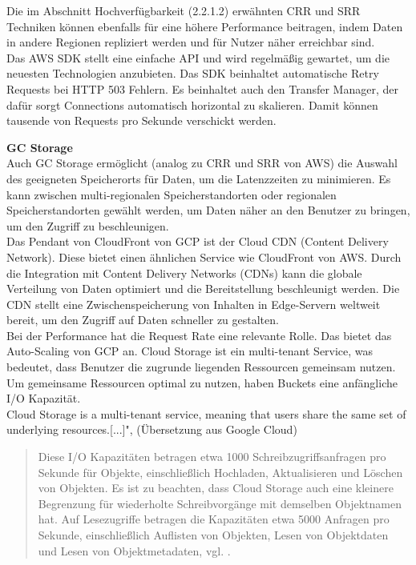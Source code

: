 Die im Abschnitt Hochverfügbarkeit (2.2.1.2) erwähnten CRR und SRR Techniken können ebenfalls für eine höhere Performance beitragen, indem Daten in andere Regionen repliziert werden und für Nutzer näher erreichbar sind.\\

Das AWS SDK stellt eine einfache API und wird regelmäßig gewartet, um die neuesten Technologien anzubieten. Das SDK beinhaltet automatische Retry Requests bei HTTP 503 Fehlern. Es beinhaltet auch den Transfer Manager, der dafür sorgt Connections automatisch horizontal zu skalieren. Damit können tausende von Requests pro Sekunde verschickt werden.

\newpage

\textbf{GC Storage}\\

Auch GC Storage ermöglicht (analog zu CRR und SRR von AWS) die Auswahl des geeigneten Speicherorts für Daten, um die Latenzzeiten zu minimieren. Es kann zwischen multi-regionalen Speicherstandorten oder regionalen Speicherstandorten gewählt werden, um Daten näher an den Benutzer zu bringen, um den Zugriff zu beschleunigen.\\ 

Das Pendant von CloudFront von GCP ist der Cloud CDN (Content Delivery Network). Diese bietet einen ähnlichen Service wie CloudFront von AWS. Durch die Integration mit Content Delivery Networks (CDNs) kann die globale Verteilung von Daten optimiert und die Bereitstellung beschleunigt werden. Die CDN stellt eine Zwischenspeicherung von Inhalten in Edge-Servern weltweit bereit, um den Zugriff auf Daten schneller zu gestalten.\\

Bei der Performance hat die Request Rate eine relevante Rolle. Das bietet das Auto-Scaling von GCP an. Cloud Storage ist ein multi-tenant Service, was bedeutet, dass Benutzer die zugrunde liegenden Ressourcen gemeinsam nutzen. Um gemeinsame Ressourcen optimal zu nutzen, haben Buckets eine anfängliche I/O Kapazität.\\ \glqq Cloud Storage is a multi-tenant service, meaning that users share the same set of underlying resources.[...]", \cite{gcp-req} (Übersetzung aus Google Cloud)

 \begin{quote}
 	Diese I/O Kapazitäten betragen etwa 1000 Schreibzugriffsanfragen pro Sekunde für Objekte, einschließlich Hochladen, Aktualisieren und Löschen von Objekten. Es ist zu beachten, dass Cloud Storage auch eine kleinere Begrenzung für wiederholte Schreibvorgänge mit demselben Objektnamen hat. Auf Lesezugriffe betragen die Kapazitäten etwa 5000 Anfragen pro Sekunde, einschließlich Auflisten von Objekten, Lesen von Objektdaten und Lesen von Objektmetadaten, vgl. \cite{gcp-req}.
 \end{quote}
 
